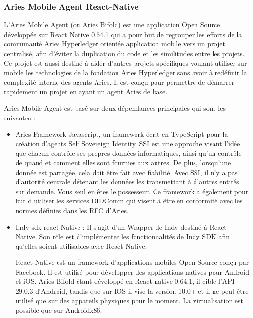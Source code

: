 \documentclass[12pt, openany]{report}
\begin{document}
\subsubsection{Aries Mobile Agent React-Native}
\noindent 
\begin{flushleft}
L'Aries Mobile Agent (ou Aries Bifold) est une application Open Source développée sur React Native 0.64.1 qui a pour but de regrouper les efforts de la communauté Aries Hyperledger orientée application mobile vers un projet centralisé, afin d'éviter la duplication du code et les similitudes entre les projets. Ce projet est aussi destiné à aider d'autres projets spécifiques voulant utiliser sur mobile les technologies de la fondation Aries Hyperledger sans avoir à redéfinir la complexité interne des agents Aries. Il est conçu pour permettre de démarrer rapidement un projet en ayant un agent Aries de base.\

Aries Mobile Agent est basé sur deux dépendances principales qui sont les suivantes :\\
\begin{itemize}

\item Aries Framework Javascript, un framework écrit en TypeScript pour la création d'agents Self Sovereign Identity. SSI est une approche visant l'idée que chacun contrôle ses propres données informatiques, ainsi qu'un contrôle de quand et comment elles sont fournies aux autres. De plus, lorsqu'une donnée est partagée, cela doit être fait avec fiabilité. Avec SSI, il n'y a pas d'autorité centrale détenant les données les transmettant à d'autres entités sur demande. Vous seul en êtes le possesseur. Ce framework a également pour but d'utiliser les services DIDComm qui visent à être en conformité avec les normes définies dans les RFC d'Aries.

\item Indy-sdk-react-Native : Il s’agit d’un Wrapper de Indy destiné à React Native. Son rôle est d’implémenter les fonctionnalités de Indy SDK afin qu’elles soient utilisables avec React Native. 

React Native est un framework d'applications mobiles Open Source conçu par Facebook. Il est utilisé pour développer des applications natives pour Android et iOS. Aries Bifold étant développé en React native 0.64.1, il cible l’API 29.0.3 d’Android, tandis que sur IOS il vise la version 10.0+ et il ne peut être utilisé que sur des appareils physiques pour le moment. La virtualisation est possible que sur Androidx86.


\end{itemize}
\end{flushleft}
\end{document}

